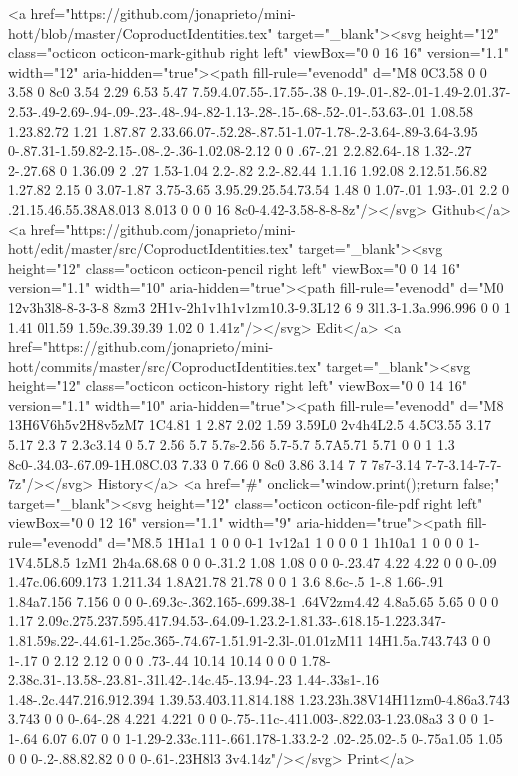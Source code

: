      <a href="https://github.com/jonaprieto/mini-hott/blob/master/CoproductIdentities.tex" target="_blank"><svg height="12" class="octicon octicon-mark-github right left" viewBox="0 0 16 16" version="1.1" width="12" aria-hidden="true"><path fill-rule="evenodd" d="M8 0C3.58 0 0 3.58 0 8c0 3.54 2.29 6.53 5.47 7.59.4.07.55-.17.55-.38 0-.19-.01-.82-.01-1.49-2.01.37-2.53-.49-2.69-.94-.09-.23-.48-.94-.82-1.13-.28-.15-.68-.52-.01-.53.63-.01 1.08.58 1.23.82.72 1.21 1.87.87 2.33.66.07-.52.28-.87.51-1.07-1.78-.2-3.64-.89-3.64-3.95 0-.87.31-1.59.82-2.15-.08-.2-.36-1.02.08-2.12 0 0 .67-.21 2.2.82.64-.18 1.32-.27 2-.27.68 0 1.36.09 2 .27 1.53-1.04 2.2-.82 2.2-.82.44 1.1.16 1.92.08 2.12.51.56.82 1.27.82 2.15 0 3.07-1.87 3.75-3.65 3.95.29.25.54.73.54 1.48 0 1.07-.01 1.93-.01 2.2 0 .21.15.46.55.38A8.013 8.013 0 0 0 16 8c0-4.42-3.58-8-8-8z"/></svg> Github</a>
      <a href="https://github.com/jonaprieto/mini-hott/edit/master/src/CoproductIdentities.tex" target="_blank"><svg height="12" class="octicon octicon-pencil right left" viewBox="0 0 14 16" version="1.1" width="10" aria-hidden="true"><path fill-rule="evenodd" d="M0 12v3h3l8-8-3-3-8 8zm3 2H1v-2h1v1h1v1zm10.3-9.3L12 6 9 3l1.3-1.3a.996.996 0 0 1 1.41 0l1.59 1.59c.39.39.39 1.02 0 1.41z"/></svg> Edit</a>
      <a href="https://github.com/jonaprieto/mini-hott/commits/master/src/CoproductIdentities.tex" target="_blank"><svg height="12" class="octicon octicon-history right left" viewBox="0 0 14 16" version="1.1" width="10" aria-hidden="true"><path fill-rule="evenodd" d="M8 13H6V6h5v2H8v5zM7 1C4.81 1 2.87 2.02 1.59 3.59L0 2v4h4L2.5 4.5C3.55 3.17 5.17 2.3 7 2.3c3.14 0 5.7 2.56 5.7 5.7s-2.56 5.7-5.7 5.7A5.71 5.71 0 0 1 1.3 8c0-.34.03-.67.09-1H.08C.03 7.33 0 7.66 0 8c0 3.86 3.14 7 7 7s7-3.14 7-7-3.14-7-7-7z"/></svg> History</a>
      <a  href="#" onclick="window.print();return false;" target="_blank"><svg height="12" class="octicon octicon-file-pdf right left" viewBox="0 0 12 16" version="1.1" width="9" aria-hidden="true"><path fill-rule="evenodd" d="M8.5 1H1a1 1 0 0 0-1 1v12a1 1 0 0 0 1 1h10a1 1 0 0 0 1-1V4.5L8.5 1zM1 2h4a.68.68 0 0 0-.31.2 1.08 1.08 0 0 0-.23.47 4.22 4.22 0 0 0-.09 1.47c.06.609.173 1.211.34 1.8A21.78 21.78 0 0 1 3.6 8.6c-.5 1-.8 1.66-.91 1.84a7.156 7.156 0 0 0-.69.3c-.362.165-.699.38-1 .64V2zm4.42 4.8a5.65 5.65 0 0 0 1.17 2.09c.275.237.595.417.94.53-.64.09-1.23.2-1.81.33-.618.15-1.223.347-1.81.59s.22-.44.61-1.25c.365-.74.67-1.51.91-2.3l-.01.01zM11 14H1.5a.743.743 0 0 1-.17 0 2.12 2.12 0 0 0 .73-.44 10.14 10.14 0 0 0 1.78-2.38c.31-.13.58-.23.81-.31l.42-.14c.45-.13.94-.23 1.44-.33s1-.16 1.48-.2c.447.216.912.394 1.39.53.403.11.814.188 1.23.23h.38V14H11zm0-4.86a3.743 3.743 0 0 0-.64-.28 4.221 4.221 0 0 0-.75-.11c-.411.003-.822.03-1.23.08a3 3 0 0 1-1-.64 6.07 6.07 0 0 1-1.29-2.33c.111-.661.178-1.33.2-2 .02-.25.02-.5 0-.75a1.05 1.05 0 0 0-.2-.88.82.82 0 0 0-.61-.23H8l3 3v4.14z"/></svg> Print</a>
